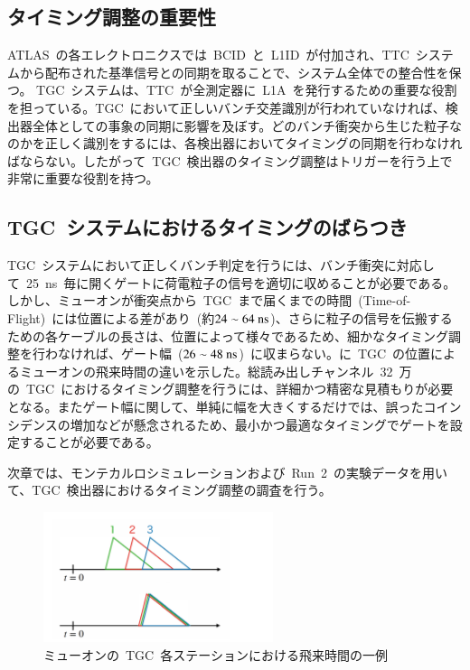 \subsection{タイミング調整の重要性}
ATLAS~の各エレクトロニクスでは~BCID~と~L1ID~が付加され、TTC~システムから配布された基準信号との同期を取ることで、システム全体での整合性を保つ。
TGC~システムは、TTC~が全測定器に~L1A~を発行するための重要な役割を担っている。TGC~において正しいバンチ交差識別が行われていなければ、検出器全体としての事象の同期に影響を及ぼす。どのバンチ衝突から生じた粒子なのかを正しく識別をするには、各検出器においてタイミングの同期を行わなければならない。したがって~TGC~検出器のタイミング調整はトリガーを行う上で非常に重要な役割を持つ。

\subsection{TGC~システムにおけるタイミングのばらつき}
TGC~システムにおいて正しくバンチ判定を行うには、バンチ衝突に対応して~25~ns~毎に開くゲートに荷電粒子の信号を適切に収めることが必要である。
しかし、ミューオンが衝突点から~TGC~まで届くまでの時間~(Time-of-Flight)~には位置による差があり~(約$\rm{24\sim64~ns}$)、さらに粒子の信号を伝搬するための各ケーブルの長さは、位置によって様々であるため、細かなタイミング調整を行わなければ、ゲート幅~($\rm{26\sim48~ns}$)~に収まらない。に~TGC~の位置によるミューオンの飛来時間の違いを示した。総読み出しチャンネル~32~万の~TGC~におけるタイミング調整を行うには、詳細かつ精密な見積もりが必要となる。またゲート幅に関して、単純に幅を大きくするだけでは、誤ったコインシデンスの増加などが懸念されるため、最小かつ最適なタイミングでゲートを設定することが必要である。

次章では、モンテカルロシミュレーションおよび~Run~2~の実験データを用いて、TGC~検出器におけるタイミング調整の調査を行う。

\begin{figure}[tbp]
    \centering   
    \includegraphics[width=0.6\textwidth,page=8]{img/slide/slide.pdf}
    \caption{ミューオンの~TGC~各ステーションにおける飛来時間の一例}
    \label{fig:tof}
\end{figure}
